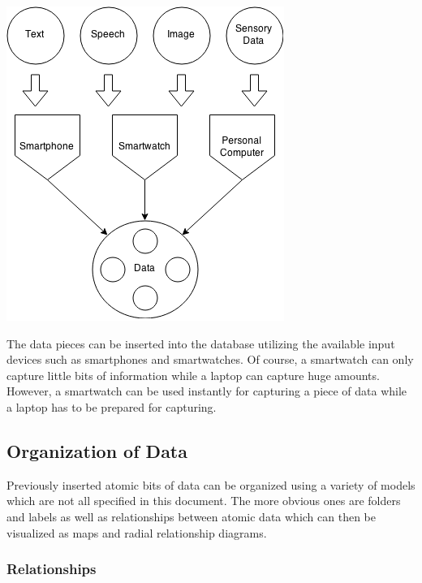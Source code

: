 \begin{center}
\includegraphics[width=0.9\linewidth]{00_resources/input_methods.png}
\end{center}

The data pieces can be inserted into the database utilizing the available input devices such as smartphones and smartwatches. Of course, a smartwatch can only capture little bits of information while a laptop can capture huge amounts. However, a smartwatch can be used instantly for capturing a piece of data while a laptop has to be prepared for capturing.

\subsection{Organization of Data}

Previously inserted atomic bits of data can be organized using a variety of models which are not all specified in this document. The more obvious ones are folders and labels as well as relationships between atomic data which can then be visualized as maps and radial relationship diagrams.

\subsubsection{Relationships}

